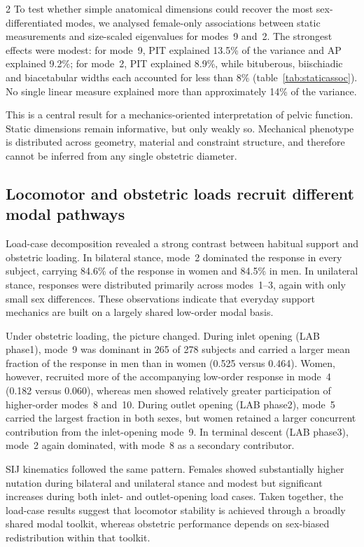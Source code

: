 \documentclass[openacc]{rsproca_new}
\begin{document}
\begin{multicols}{2}
To test whether simple anatomical dimensions could recover the most sex-differentiated modes, we analysed female-only associations between static measurements and size-scaled eigenvalues for modes~9 and~2. The strongest effects were modest: for mode~9, PIT explained 13.5\% of the variance and AP explained 9.2\%; for mode~2, PIT explained 8.9\%, while bituberous, biischiadic and biacetabular widths each accounted for less than 8\% (table~\ref{tab:staticassoc}). No single linear measure explained more than approximately 14\% of the variance.

This is a central result for a mechanics-oriented interpretation of pelvic function. Static dimensions remain informative, but only weakly so. Mechanical phenotype is distributed across geometry, material and constraint structure, and therefore cannot be inferred from any single obstetric diameter.

\subsection{Locomotor and obstetric loads recruit different modal pathways}

Load-case decomposition revealed a strong contrast between habitual support and obstetric loading. In bilateral stance, mode~2 dominated the response in every subject, carrying 84.6\% of the response in women and 84.5\% in men. In unilateral stance, responses were distributed primarily across modes~1--3, again with only small sex differences. These observations indicate that everyday support mechanics are built on a largely shared low-order modal basis.

Under obstetric loading, the picture changed. During inlet opening (LAB phase1), mode~9 was dominant in 265 of 278 subjects and carried a larger mean fraction of the response in men than in women (0.525 versus 0.464). Women, however, recruited more of the accompanying low-order response in mode~4 (0.182 versus 0.060), whereas men showed relatively greater participation of higher-order modes~8 and~10. During outlet opening (LAB phase2), mode~5 carried the largest fraction in both sexes, but women retained a larger concurrent contribution from the inlet-opening mode~9. In terminal descent (LAB phase3), mode~2 again dominated, with mode~8 as a secondary contributor.

SIJ kinematics followed the same pattern. Females showed substantially higher nutation during bilateral and unilateral stance and modest but significant increases during both inlet- and outlet-opening load cases. Taken together, the load-case results suggest that locomotor stability is achieved through a broadly shared modal toolkit, whereas obstetric performance depends on sex-biased redistribution within that toolkit.


\end{multicols}
\end{document}
